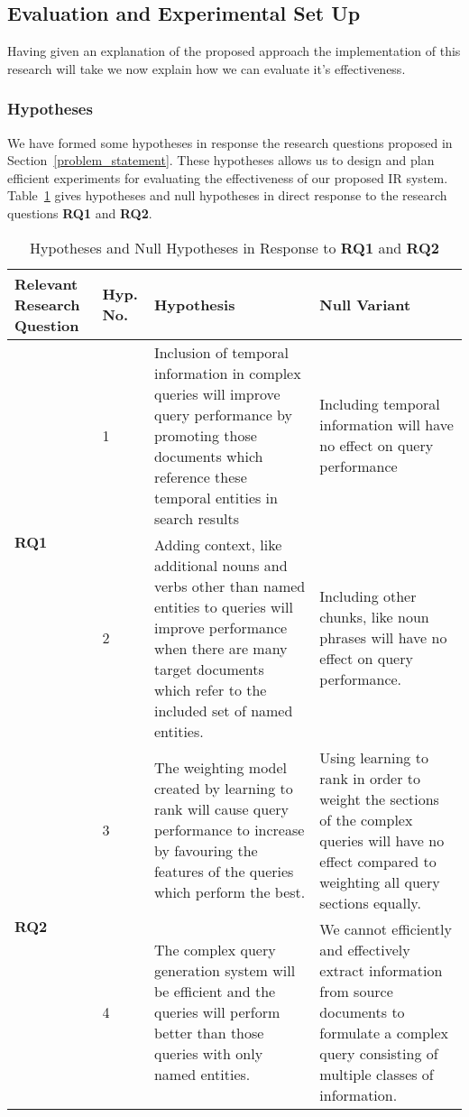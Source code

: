 \documentclass{mprop}
\begin{document}

\subsection{Evaluation and Experimental Set Up}\label{proposed_approach.evaluation}
Having given an explanation of the proposed approach the implementation of this research will take we now explain how we can evaluate it's effectiveness.

\subsubsection{Hypotheses}
We have formed some hypotheses in response the research questions proposed in Section~\ref{problem_statement}. 
These hypotheses allows us to design and plan efficient experiments for evaluating the effectiveness of our proposed IR system.
Table~\ref{hypotheses.table} gives hypotheses and null hypotheses in direct response to the research questions \textbf{RQ1} and \textbf{RQ2}.

\begin{table}[H]
\centering
\begin{tabular}{|p{2cm}|p{1cm}|p{6cm}|p{6cm}|}
\hline
Relevant Research Question  & Hyp. No.  & Hypothesis & Null Variant     \\ \hline
\multirow{2}{*}{\textbf{RQ1}} & 1 & Inclusion of temporal information in complex queries will improve query performance by promoting those documents which reference these temporal entities in search results & Including temporal information will have no effect on query performance\\ \cline{2-4}
& 2 & Adding context, like additional nouns and verbs other than named entities to queries will improve performance when there are many target documents which refer to the included set of named entities. & Including other chunks, like noun phrases will have no effect on query performance. \\ \cline{1-4}
\multirow{2}{*}{\textbf{RQ2}} & 3 & The weighting model created by learning to rank will cause query performance to increase by favouring the features of the queries which perform the best. & Using learning to rank in order to weight the sections of the complex queries will have no effect compared to weighting all query sections equally. \\ \cline{2-4}
& 4 & The complex query generation system will be efficient and the queries will perform better than those queries with only named entities. & We cannot efficiently and effectively extract information from source documents to formulate a complex query consisting of multiple classes of information. \\ \cline{1-4}
\end{tabular}
\caption{Hypotheses and Null Hypotheses in Response to \textbf{RQ1} and \textbf{RQ2}}
\label{hypotheses.table}
\end{table}
\end{document}
